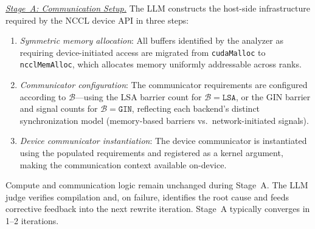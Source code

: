 \noindent\underline{\emph{Stage~A: Communication Setup.}} The LLM constructs the host-side infrastructure required by the NCCL device API in three steps:
\begin{enumerate}[leftmargin=1.4em,itemsep=1pt,topsep=2pt]
\item \emph{Symmetric memory allocation}: All buffers identified by the analyzer as requiring device-initiated access are migrated from \texttt{cudaMalloc} to \texttt{ncclMemAlloc}, which allocates memory uniformly addressable across ranks.
\item \emph{Communicator configuration}: The communicator requirements are configured according to $\mathcal{B}$---using the LSA barrier count for $\mathcal{B}{=}\texttt{LSA}$, or the GIN barrier and signal counts for $\mathcal{B}{=}\texttt{GIN}$, reflecting each backend's distinct synchronization model (memory-based barriers vs.\ network-initiated signals).
\item \emph{Device communicator instantiation}: The device communicator is instantiated using the populated requirements and registered as a kernel argument, making the communication context available on-device.
\end{enumerate}
Compute and communication logic remain unchanged during Stage~A. The LLM judge verifies compilation and, on failure, identifies the root cause and feeds corrective feedback into the next rewrite iteration. Stage~A typically converges in 1--2 iterations.

